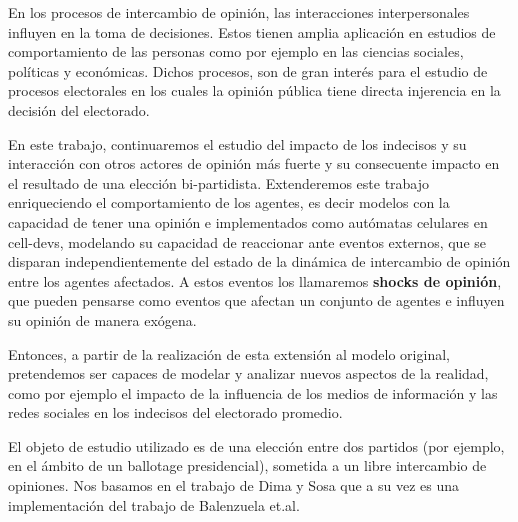 En los procesos de intercambio de opinión, las interacciones interpersonales influyen en la toma de decisiones. Estos tienen amplia aplicación en estudios de comportamiento de las personas como por ejemplo en las ciencias sociales, políticas y económicas. Dichos procesos, son de gran interés para el estudio de procesos electorales en los cuales la opinión pública tiene directa injerencia en la decisión del electorado.

En este trabajo, continuaremos el estudio del impacto de los indecisos y su
interacción con otros actores de opinión más fuerte y su consecuente impacto en
el resultado de una elección bi-partidista. Extenderemos este trabajo
enriqueciendo el comportamiento de los agentes, es decir modelos con la capacidad de tener una opinión e implementados como autómatas celulares en cell-devs, modelando su capacidad de reaccionar ante eventos externos,
que se disparan independientemente del estado de la dinámica de intercambio de
opinión entre los agentes afectados. A estos eventos los
llamaremos \textbf{shocks de opinión}, que pueden pensarse como eventos que
afectan un conjunto de agentes e influyen su opinión de manera exógena.

Entonces, a partir de la realización de esta extensión al modelo original, pretendemos ser capaces de modelar y analizar nuevos aspectos de la realidad, como por ejemplo el impacto de la influencia de los medios de información y las redes sociales en los indecisos del electorado promedio.

El objeto de estudio utilizado  es de una elección entre dos partidos (por ejemplo, en el ámbito de un ballotage presidencial), sometida a un libre intercambio de opiniones. Nos basamos en el trabajo de Dima y Sosa\cite{dina2015}  que a su vez es una implementación del trabajo de Balenzuela et.al\cite{balenzuela}.
